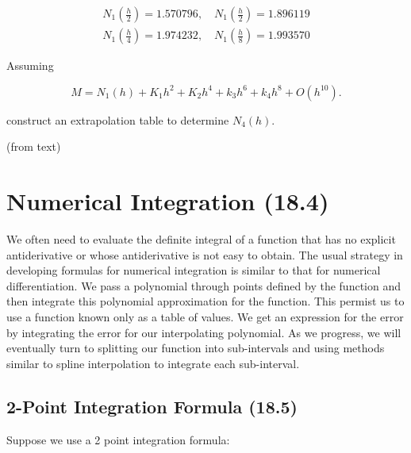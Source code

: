 \begin{align*}
N_{1}\left(\frac{h}{2}\right) = 1.570796,\quad 
N_{1}\left(\frac{h}{2}\right) = 1.896119\\[6pt]
N_{1}\left(\frac{h}{4}\right) = 1.974232,\quad 
N_{1}\left(\frac{h}{8}\right) = 1.993570
\end{align*}

Assuming 

\[
M = N_1(h) + K_1h^2 + K_2h^4 + k_3h^6 + k_4h^8 + O(h^{10})
.\]

construct an extrapolation table to determine $N_4(h)$.

\soln (from text)

\pagebreak
\section{Numerical Integration (18.4)}\label{sec:numerical_integration}

We often need to evaluate the definite integral of a function that has no
explicit antiderivative or whose antiderivative is not easy to obtain. The usual
strategy in developing formulas for numerical integration is similar to that for
numerical differentiation. We pass a polynomial through points defined by the
function and then integrate this polynomial approximation for the function. This
permist us to use a function known only as a table of values. We get an
expression for the error by integrating the error for our interpolating
polynomial. As we progress, we will eventually turn to splitting our function
into sub-intervals and using methods similar to spline interpolation to
integrate each sub-interval.

\subsection{2-Point Integration Formula (18.5)}\label{sec:two_point_integration}

Suppose we use a 2 point integration formula:

